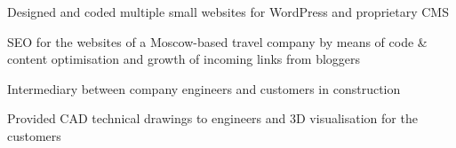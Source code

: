 \documentclass[]{vn-resume}
\begin{document}
\begin{minipage}[t]{0.66\textwidth}
    \begin{tightemize}
        \item Designed and coded multiple small websites for WordPress and proprietary CMS
    \end{tightemize}
    \sectionsep

    \begin{tightemize}
        \item SEO for the websites of a Moscow-based travel company by means of code \& content optimisation and growth of incoming links from bloggers
    \end{tightemize}
    \sectionsep
    
    \begin{tightemize}
        \item Intermediary between company engineers and customers in construction 
        \item Provided CAD technical drawings to engineers and 3D visualisation for the customers
    \end{tightemize}
    \sectionsep
    
    
    
    
    

\end{minipage}
\end{document}

